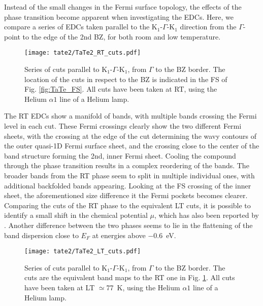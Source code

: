 Instead of the small changes in the Fermi surface topology, the effects of the phase transition become apparent when investigating the EDCs.
Here, we compare a series of EDCs taken parallel to the K$_1$-$\Gamma$-K$_1$ direction from the $\Gamma$-point to the edge of the 2nd BZ, for both room and low temperature.

\begin{figure}[t!]
	\centering
	\texttt{[image: tate2/TaTe2\_RT\_cuts.pdf]}
	\caption{Series of cuts parallel to K$_1$-$\Gamma$-K$_1$, from $\Gamma$ to the BZ border. The location of the cuts in respect to the BZ is indicated in the FS of Fig. \ref{fig:TaTe_FS}. All cuts have been taken at RT, using the Helium $\alpha1$ line of a Helium lamp.}
	\label{fig:TaTe_RT_cuts}
\end{figure}

The RT EDCs show a manifold of bands, with multiple bands crossing the Fermi level in each cut.
These Fermi crossings clearly show the two different Fermi sheets, with the crossing at the edge of the cut determining the wavy contours of the outer quasi-1D Fermi surface sheet, and the crossing close to the center of the band structure forming the 2nd, inner Fermi sheet.
Cooling the compound through the phase transition results in a complex reordering of the bands.
The broader bands from the RT phase seem to split in multiple individual ones, with additional backfolded bands appearing.
Looking at the FS crossing of the inner sheet, the aforementioned size difference it the Fermi pockets becomes clearer.
Comparing the cuts of the RT phase to the equivalent LT cuts, it is possible to identify a small shift in the chemical potential $\mu$, which has also been reported by \cite{mitsuishi_unveiling_2024}.
Another difference between the two phases seems to lie in the flattening of the band dispersion close to $E_F$ at energies above \SI{-0.6}{\electronvolt}.

\begin{figure}[h]
	\centering
	\texttt{[image: tate2/TaTe2\_LT\_cuts.pdf]}
	\caption{Series of cuts parallel to K$_1$-$\Gamma$-K$_1$, from $\Gamma$ to the BZ border. The cuts are the equivalent band maps to the RT one in Fig. \ref{fig:TaTe_RT_cuts}. All cuts have been taken at LT $\simeq$\SI{77}{\kelvin}, using the Helium $\alpha1$ line of a Helium lamp.}
	\label{fig:TaTe_LT_cuts}
\end{figure}

